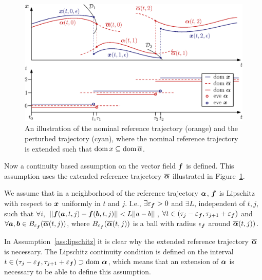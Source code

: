 \documentclass[../DC2017114Bouma.tex]{subfiles}
\begin{document}
\begin{figure}[h]
\centering
\includegraphics[width=.9\textwidth]{refspreaddom.eps}\caption{An illustration of the nominal reference trajectory (orange) and the perturbed trajectory (cyan), where the nominal reference trajectory is extended such that $\operatorname{\textnormal{dom}} x\subseteq\operatorname{\textnormal{dom}} \overline{\alpha}$.} \label{fig:3refspread}
\end{figure}

Now a continuity based assumption on the vector field ${\boldsymbol{f}}$ is defined. This assumption uses the extended reference trajectory $\overline{\boldsymbol{\alpha}}$ illustrated in Figure~\ref{fig:3refspread}.

\begin{myass}\label{ass:lipschitz}
We assume that in a neighborhood of the reference trajectory $\boldsymbol{\alpha}$, ${\boldsymbol{f}}$ is Lipschitz with respect to ${\boldsymbol{x}}$ uniformly in $t$ and $j$. I.e., $\exists\varepsilon_{{\boldsymbol{f}}}>0$ and $\exists L$, independent of $t,j$, such that $\forall i$, $||{\boldsymbol{f}}({\boldsymbol{a}},t,j) - {\boldsymbol{f}}({\boldsymbol{b}},t,j)||<L||a-b||$, $\forall t\in (\tau_j - \varepsilon_{{\boldsymbol{f}}},\tau_{j+1} + \varepsilon_{{\boldsymbol{f}}})$ and $\forall {\boldsymbol{a}},{\boldsymbol{b}}\in B_{\varepsilon_{{\boldsymbol{f}}}}(\overline{\boldsymbol{\alpha}}(t,j))$, where $B_{\varepsilon_{{\boldsymbol{f}}}}(\overline{\boldsymbol{\alpha}}(t,j))$ is a ball with radius $\epsilon_{{\boldsymbol{f}}}$ around $\overline{\boldsymbol{\alpha}}(t,j))$.
\end{myass}

In Assumption~\ref{ass:lipschitz} it is clear why the extended reference trajectory $\overline{\boldsymbol{\alpha}}$ is necessary. The Lipschitz continuity condition is defined on the interval $t \in (\tau_j - \varepsilon_{{\boldsymbol{f}}},\tau_{j+1} + \varepsilon_{{\boldsymbol{f}}}) \supset \text{dom }\boldsymbol{\alpha}$, which means that an extension of $\boldsymbol{\alpha}$ is necessary to be able to define this assumption.
\end{document}
